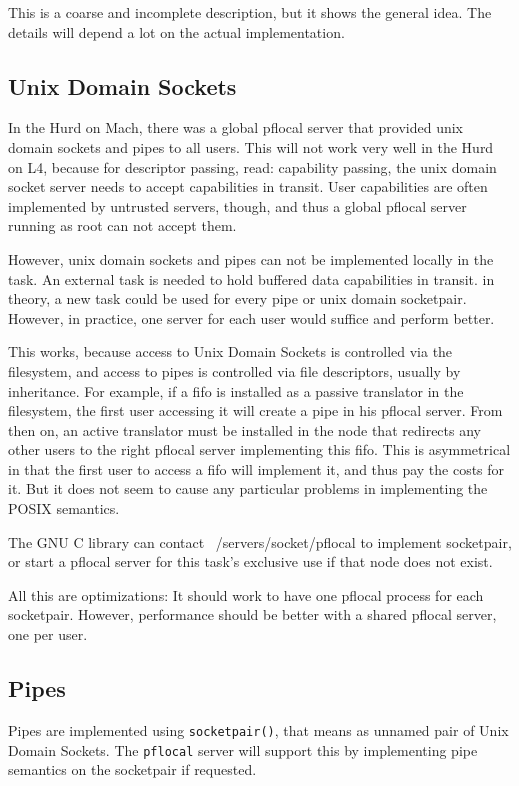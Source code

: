 \documentclass[9pt,a4paper]{extarticle}
\begin{document}
This is a coarse and incomplete description, but it shows the general
idea.  The details will depend a lot on the actual implementation.


\subsection{Unix Domain Sockets}

In the Hurd on Mach, there was a global pflocal server that provided
unix domain sockets and pipes to all users.  This will not work very
well in the Hurd on L4, because for descriptor passing, read:
capability passing, the unix domain socket server needs to accept
capabilities in transit.  User capabilities are often implemented by
untrusted servers, though, and thus a global pflocal server running as
root can not accept them.

However, unix domain sockets and pipes can not be implemented locally
in the task.  An external task is needed to hold buffered data
capabilities in transit.  in theory, a new task could be used for
every pipe or unix domain socketpair.  However, in practice, one
server for each user would suffice and perform better.

This works, because access to Unix Domain Sockets is controlled via
the filesystem, and access to pipes is controlled via file
descriptors, usually by inheritance.  For example, if a fifo is
installed as a passive translator in the filesystem, the first user
accessing it will create a pipe in his pflocal server.  From then on,
an active translator must be installed in the node that redirects any
other users to the right pflocal server implementing this fifo.  This
is asymmetrical in that the first user to access a fifo will implement
it, and thus pay the costs for it.  But it does not seem to cause any
particular problems in implementing the POSIX semantics.

The GNU C library can contact ~/servers/socket/pflocal to implement
socketpair, or start a pflocal server for this task's exclusive use if
that node does not exist.

All this are optimizations: It should work to have one pflocal process
for each socketpair.  However, performance should be better with a
shared pflocal server, one per user.


\subsection{Pipes}

Pipes are implemented using \texttt{socketpair()}, that means as
unnamed pair of Unix Domain Sockets.  The \texttt{pflocal} server will
support this by implementing pipe semantics on the socketpair if
requested.
\end{document}
